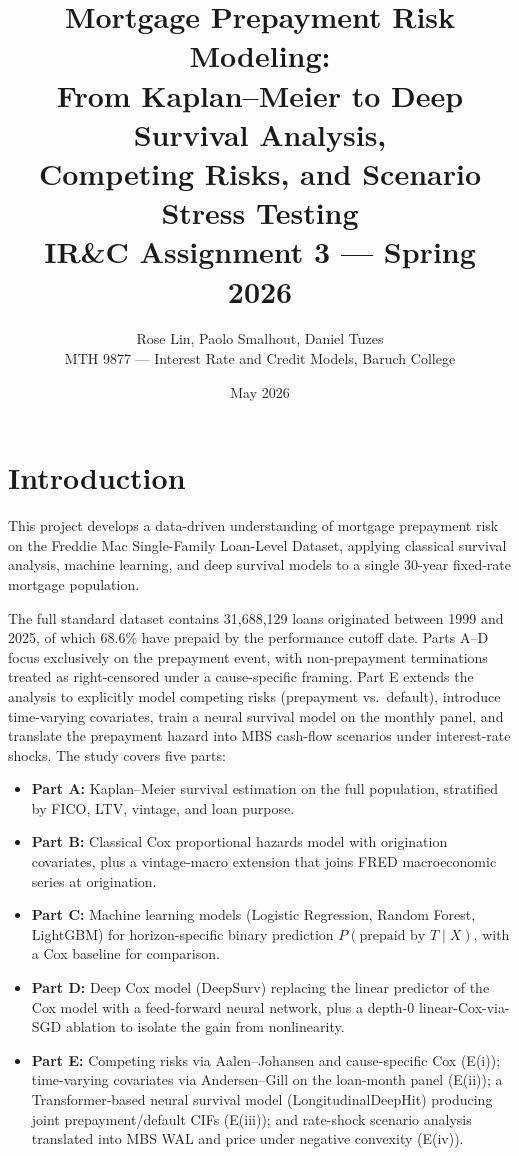 \documentclass[11pt,a4paper]{article}
\title{\vspace{-1.5em}\textbf{Mortgage Prepayment Risk Modeling:\\
From Kaplan--Meier to Deep Survival Analysis,\\
Competing Risks, and Scenario Stress Testing}\\[0.3em]
\large IR\&C Assignment 3 --- Spring 2026}
\author{Rose Lin, Paolo Smalhout, Daniel Tuzes\\\small MTH 9877 --- Interest Rate and Credit Models, Baruch College}
\date{May 2026}
\begin{document}
\maketitle
\vspace{-1.2em}

\section{Introduction}

This project develops a data-driven understanding of mortgage prepayment risk on the Freddie Mac Single-Family Loan-Level Dataset, applying classical survival analysis, machine learning, and deep survival models to a single 30-year fixed-rate mortgage population.

The full standard dataset contains 31{,}688{,}129 loans originated between 1999 and 2025, of which 68.6\% have prepaid by the performance cutoff date. Parts A--D focus exclusively on the prepayment event, with non-prepayment terminations treated as right-censored under a cause-specific framing. Part E extends the analysis to explicitly model competing risks (prepayment vs.\ default), introduce time-varying covariates, train a neural survival model on the monthly panel, and translate the prepayment hazard into MBS cash-flow scenarios under interest-rate shocks. The study covers five parts:

\begin{itemize}[leftmargin=1.2em,itemsep=2pt,topsep=2pt]
  \item \textbf{Part A:} Kaplan--Meier survival estimation on the full population, stratified by FICO, LTV, vintage, and loan purpose.
  \item \textbf{Part B:} Classical Cox proportional hazards model with origination covariates, plus a vintage-macro extension that joins FRED macroeconomic series at origination.
  \item \textbf{Part C:} Machine learning models (Logistic Regression, Random Forest, LightGBM) for horizon-specific binary prediction $P(\text{prepaid by } T \mid X)$, with a Cox baseline for comparison.
  \item \textbf{Part D:} Deep Cox model (DeepSurv) replacing the linear predictor of the Cox model with a feed-forward neural network, plus a depth-0 linear-Cox-via-SGD ablation to isolate the gain from nonlinearity.
  \item \textbf{Part E:} Competing risks via Aalen--Johansen and cause-specific Cox (E(i)); time-varying covariates via Andersen--Gill on the loan-month panel (E(ii)); a Transformer-based neural survival model (LongitudinalDeepHit) producing joint prepayment/default CIFs (E(iii)); and rate-shock scenario analysis translated into MBS WAL and price under negative convexity (E(iv)).
\end{itemize}
\end{document}
